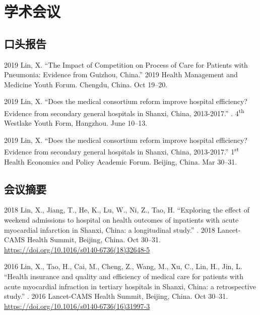 \documentclass[12pt,letterpaper]{report}
\begin{document}
 
\section*{学术会议}

    \subsection*{口头报告}

    \begin{tablist}
    
    	 \item[2019] \tab Lin, X. \enquote{The Impact of Competition on Process of Care for Patients with Pneumonia: Evidence from Guizhou, China.}  2019 Health Management and Medicine Youth Forum. Chengdu, China. Oct 19--20.
		  
		  \item[2019] \tab Lin, X. \enquote{Does the medical consortium reform improve hospital efficiency? Evidence from secondary general hospitals in Shanxi, China, 2013-2017.} . 4\textsuperscript{th} Westlake Youth Form, Hangzhou. June 10--13. 
		         
        \item[2019] \tab Lin, X. \enquote{Does the medical consortium reform improve hospital efficiency? Evidence from secondary general hospitals in Shanxi, China, 2013-2017.}  1\textsuperscript{st} Health Economics and Policy Academic Forum. Beijing, China. Mar 30--31.
        		
    \end{tablist}
    
    \subsection*{会议摘要}

    \begin{tablist}
        
        \item[2018] \tab Lin, X., Jiang, T., He, K., Lu, W., Ni, Z., Tao, H. \enquote{Exploring the effect of weekend admissions to hospital on health outcomes of inpatients with acute myocardial infarction in Shanxi, China: a longitudinal study.} . 2018 Lancet-CAMS Health Summit, Beijing, China. Oct 30--31. \href{https://doi.org/10.1016/s0140-6736(18)32648-5}{https://doi.org/10.1016/s0140-6736(18)32648-5}

		\item[2016] \tab Lin, X., Tao, H., Cai, M., Cheng, Z., Wang, M., Xu, C., Lin, H., Jin, L. \enquote{Health insurance and quality and efficiency of medical care for patients with acute myocardial infraction in tertiary hospitals in Shanxi, China: a retrospective study.} . 2016 Lancet-CAMS Health Summit, Beijing, China. Oct 30--31.  \href{https://doi.org/10.1016/s0140-6736(16)31997-3}{https://doi.org/10.1016/s0140-6736(16)31997-3 }            
  
    \end{tablist}
    
\end{document}
